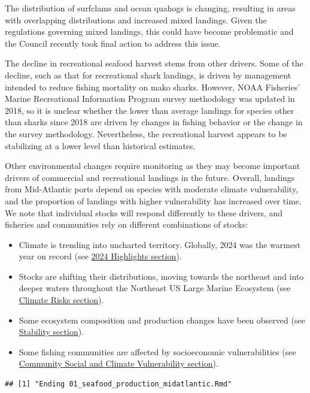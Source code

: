 \documentclass[
  10pt,
]{article}
\providecommand{\tightlist}{%
  \setlength{\itemsep}{0pt}\setlength{\parskip}{0pt}}
\begin{document}
The distribution of surfclams and ocean quahogs is changing, resulting in areas with overlapping distributions and increased mixed landings. Given the regulations governing mixed landings, this could have become problematic and the Council recently took final action to address this issue.

The decline in recreational seafood harvest stems from other drivers. Some of the decline, such as that for recreational shark landings, is driven by management intended to reduce fishing mortality on mako sharks. However, NOAA Fisheries' Marine Recreational Information Program survey methodology was updated in 2018, so it is unclear whether the lower than average landings for species other than sharks since 2018 are driven by changes in fishing behavior or the change in the survey methodology. Nevertheless, the recreational harvest appears to be stabilizing at a lower level than historical estimates.

Other environmental changes require monitoring as they may become important drivers of commercial and recreational landings in the future. Overall, landings from Mid-Atlantic ports depend on species with moderate climate vulnerability, and the proportion of landings with higher vulnerability has increased over time. We note that individual stocks will respond differently to these drivers, and fisheries and communities rely on different combinations of stocks:

\begin{itemize}
\tightlist
\item
  Climate is trending into uncharted territory. Globally, 2024 was the warmest year on record (see \hyperref[highlights]{2024 Highlights section}).
\item
  Stocks are shifting their distributions, moving towards the northeast and into deeper waters throughout the Northeast US Large Marine Ecosystem (see \hyperref[climate-and-ecosystem-change]{Climate Risks section}).
\item
  Some ecosystem composition and production changes have been observed (see \hyperref[stability]{Stability section}).
\item
  Some fishing communities are affected by socioeconomic vulnerabilities (see \hyperref[community-social-and-climate-vulnerability]{Community Social and Climate Vulnerability section}).
\end{itemize}

\begin{verbatim}
## [1] "Ending 01_seafood_production_midatlantic.Rmd"
\end{verbatim}
\end{document}
